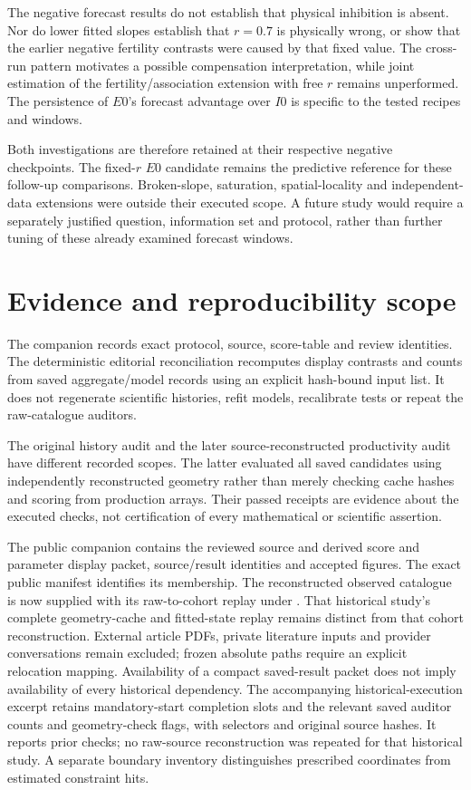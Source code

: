 The negative forecast results do not establish that physical inhibition
is absent. Nor do lower fitted slopes establish that \(r=0.7\) is
physically wrong, or show that the earlier negative fertility contrasts
were caused by that fixed value. The cross-run pattern motivates a
possible compensation interpretation, while joint estimation of the
fertility/association extension with free \(r\) remains unperformed.
The persistence of \(E0\)'s forecast advantage over \(I0\) is specific
to the tested recipes and windows.

Both investigations are therefore retained at their respective negative
checkpoints. The fixed-\(r\) \(E0\) candidate remains the predictive
reference for these follow-up comparisons. Broken-slope, saturation,
spatial-locality and independent-data extensions were outside their
executed scope. A future study would require a separately justified
question, information set and protocol, rather than further tuning of
these already examined forecast windows.

\section{Evidence and reproducibility scope}
\label{a2:repro-scope}

The companion records exact protocol, source, score-table and review
identities. The deterministic editorial reconciliation recomputes display
contrasts and counts from saved aggregate/model records using an explicit
hash-bound input list. It does not regenerate scientific histories,
refit models, recalibrate tests or repeat the raw-catalogue auditors.

The original history audit and the later source-reconstructed productivity
audit have different recorded scopes. The latter evaluated all saved
candidates using independently reconstructed geometry rather than merely
checking cache hashes and scoring from production arrays. Their passed
receipts are evidence about the executed checks, not certification of
every mathematical or scientific assertion.

The public companion contains the reviewed source and derived score and
parameter display packet, source/result identities and accepted figures.
The exact public manifest identifies its membership. The reconstructed
observed catalogue is now supplied with its raw-to-cohort replay under
. That historical study's complete geometry-cache and
fitted-state replay remains distinct from that cohort reconstruction.
External article PDFs, private literature inputs and provider conversations
remain excluded; frozen absolute paths require an explicit relocation mapping.
Availability of a compact saved-result packet does not imply availability
of every historical dependency.
The accompanying historical-execution excerpt retains mandatory-start
completion slots and the relevant saved auditor counts and geometry-check
flags, with selectors and original source hashes. It reports prior checks;
no raw-source reconstruction was repeated for that historical study. A separate
boundary inventory distinguishes prescribed coordinates from estimated
constraint hits.

